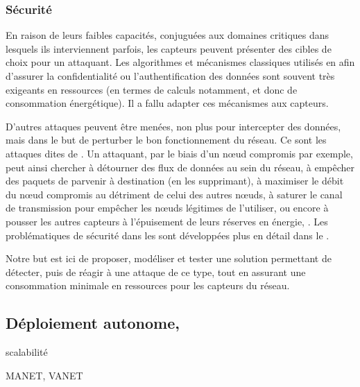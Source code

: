 
        \subsubsection{Sécurité}
En raison de leurs faibles capacités, conjuguées aux domaines critiques dans lesquels ils interviennent parfois, les capteurs peuvent présenter des cibles de choix pour un attaquant.
Les algorithmes et mécanismes classiques utilisés en  afin d'assurer la confidentialité ou l'authentification des données sont souvent très exigeants en ressources (en termes de calculs notamment, et donc de consommation énergétique).
Il a fallu adapter ces mécanismes aux capteurs.

D'autres attaques peuvent être menées, non plus pour intercepter des données, mais dans le but de perturber le bon fonctionnement du réseau.
Ce sont les attaques dites de \textit{\dds}.
Un attaquant, par le biais d'un nœud compromis par exemple, peut ainsi chercher à détourner des flux de données au sein du réseau, à empêcher des paquets de parvenir à destination (en les supprimant), à maximiser le débit du nœud compromis au détriment de celui des autres nœuds, à saturer le canal de transmission pour empêcher les nœuds légitimes de l'utiliser, ou encore à pousser les autres capteurs à l'épuisement de leurs réserves en énergie, \etc.
Les problématiques de sécurité dans les \rcs sont développées plus en détail dans le .

Notre but est ici de proposer, modéliser et tester une solution permettant de détecter, puis de réagir à une attaque de ce type, tout en assurant une consommation minimale en ressources pour les capteurs du réseau.

        \subsection{Déploiement autonome, }
    scalabilité

    MANET, VANET
    \cite{DYK12}
